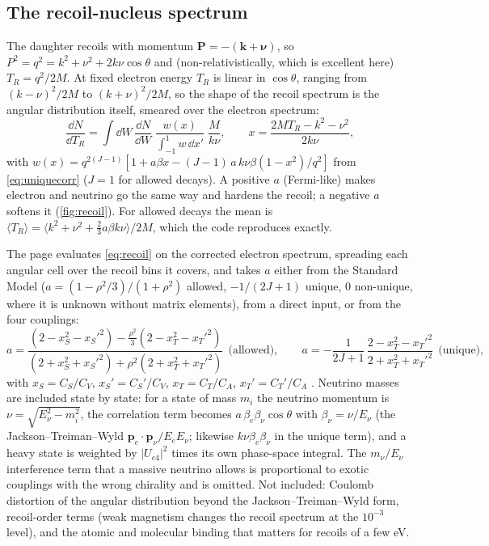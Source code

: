 \subsection{The recoil-nucleus spectrum}
\label{sec:recoil}
The daughter recoils with momentum $\bm P = -(\bm k + \bm\nu)$, so $P^2 = q^2 = k^2 + \nu^2 + 2k\nu\cos\theta$ and (non-relativistically, which is excellent here) $T_R = q^2/2M$. At fixed electron energy $T_R$ is linear in $\cos\theta$, ranging from $(k-\nu)^2/2M$ to $(k+\nu)^2/2M$, so the shape of the recoil spectrum is the angular distribution itself, smeared over the electron spectrum:
\begin{equation}
\frac{\dd N}{\dd T_R} = \int \dd W\,\frac{\dd N}{\dd W}\;\frac{w(x)}{\int_{-1}^{1} w\,\dd x'}\;\frac{M}{k\nu},
\qquad x = \frac{2MT_R - k^2 - \nu^2}{2k\nu},
\label{eq:recoil}
\end{equation}
with $w(x) = q^{2(J-1)}\left[1 + a\beta x - (J-1)\,a\,k\nu\beta(1-x^2)/q^2\right]$ from \cref{eq:uniquecorr} ($J = 1$ for allowed decays). A positive $a$ (Fermi-like) makes electron and neutrino go the same way and hardens the recoil; a negative $a$ softens it (\cref{fig:recoil}). For allowed decays the mean is $\langle T_R\rangle = \langle k^2 + \nu^2 + \tfrac23 a\beta k\nu\rangle/2M$, which the code reproduces exactly.

The page evaluates \cref{eq:recoil} on the corrected electron spectrum, spreading each angular cell over the recoil bins it covers, and takes $a$ either from the Standard Model ($a = (1-\rho^2/3)/(1+\rho^2)$ allowed, $-1/(2J+1)$ unique, 0 non-unique, where it is unknown without matrix elements), from a direct input, or from the four couplings:
\begin{equation}
a = \frac{(2 - x_S^2 - x_S'^2) - \frac{\rho^2}{3}(2 - x_T^2 - x_T'^2)}{(2 + x_S^2 + x_S'^2) + \rho^2(2 + x_T^2 + x_T'^2)}\ \ \text{(allowed)},\qquad
a = -\frac{1}{2J+1}\,\frac{2 - x_T^2 - x_T'^2}{2 + x_T^2 + x_T'^2}\ \ \text{(unique)},
\end{equation}
with $x_S = C_S/C_V$, $x_S' = C_S'/C_V$, $x_T = C_T/C_A$, $x_T' = C_T'/C_A$ \cite{jtw,gm23}. Neutrino masses are included state by state: for a state of mass $m_i$ the neutrino momentum is $\nu = \sqrt{E_\nu^2 - m_i^2}$, the correlation term becomes $a\,\beta_e\beta_\nu\cos\theta$ with $\beta_\nu = \nu/E_\nu$ (the Jackson--Treiman--Wyld $\bm p_e\cdot\bm p_\nu/E_eE_\nu$; likewise $k\nu\beta_e\beta_\nu$ in the unique term), and a heavy state is weighted by $|U_{e4}|^2$ times its own phase-space integral. The $m_\nu/E_\nu$ interference term that a massive neutrino allows is proportional to exotic couplings with the wrong chirality and is omitted. Not included: Coulomb distortion of the angular distribution beyond the Jackson--Treiman--Wyld form, recoil-order terms (weak magnetism changes the recoil spectrum at the $10^{-3}$ level), and the atomic and molecular binding that matters for recoils of a few eV.

